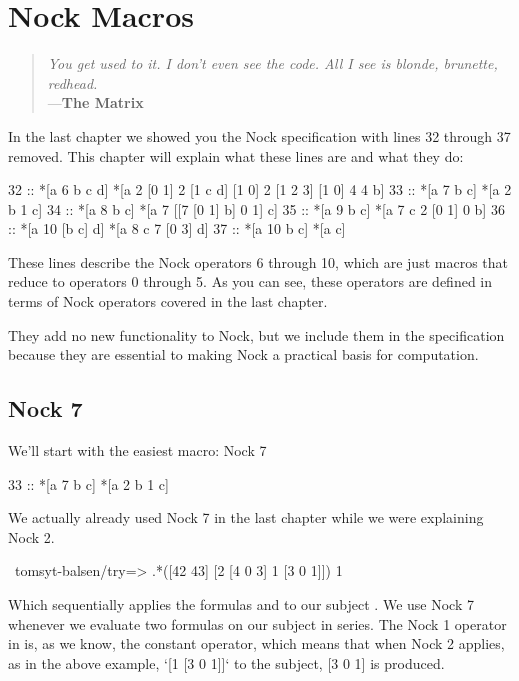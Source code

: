 \chapter{Nock Macros}

\begin{quote}
\noindent \emph{You get used to it. I don't even see the code.
All I see is blonde, brunette, redhead.}
\medskip \\
---\textbf{The Matrix}
\end{quote}

In the last chapter we showed you the Nock specification with lines 32 through 37 removed.
This chapter will explain what these lines are and what they do:

\begin{code}
32 ::    *[a 6 b c d]     *[a 2 [0 1] 2 [1 c d] [1 0] 2 [1 2 3] [1 0] 4 4 b]
33 ::    *[a 7 b c]       *[a 2 b 1 c]
34 ::    *[a 8 b c]       *[a 7 [[7 [0 1] b] 0 1] c]
35 ::    *[a 9 b c]       *[a 7 c 2 [0 1] 0 b]
36 ::    *[a 10 [b c] d]  *[a 8 c 7 [0 3] d]
37 ::    *[a 10 b c]      *[a c]
\end{code}

These lines describe the Nock operators 6 through 10, which are just macros that reduce to operators 0 through 5. As you can see, these operators are defined in terms of Nock operators covered in the last chapter.

They add no new functionality to Nock, but we include them in the specification because they are essential to making Nock a practical basis for computation.

\section{Nock 7}

We'll start with the easiest macro: Nock 7

\begin{code}
33 ::    *[a 7 b c]       *[a 2 b 1 c]
\end{code}
We actually already used Nock 7 in the last chapter while we were explaining Nock 2.

\begin{code}
~tomsyt-balsen/try=> .*([42 43] [2 [4 0 3] 1 [3 0 1]])
1
\end{code}
Which sequentially applies the formulas \kode{[4 0 3]} and \kode{[3 0 1]} to our subject \kode{[42 43]}. We use Nock 7 whenever we evaluate two formulas on our subject in series. The Nock 1 operator in \kode{*[a 2 b 1 c]} is, as we know, the constant operator, which means that when Nock 2 applies, as in the above example, `[1 [3 0 1]]` to the subject, [3 0 1] is produced.

